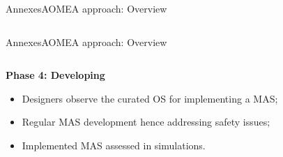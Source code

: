 \begin{frame}{Annexes}{AOMEA approach: Overview}
\begin{columns}
    \end{columns}

\end{frame}

\begin{frame}{Annexes}{AOMEA approach: Overview}

    \begin{columns}

        \begin{column}{0.6\textwidth}

            \textbf{Phase 4: Developing}

            \begin{itemize}
                \item Designers observe the curated OS for implementing a MAS;
                \item Regular MAS development hence addressing safety issues;
                \item Implemented MAS assessed in simulations.
            \end{itemize}

        \end{column}


\end{columns}
\end{frame}
